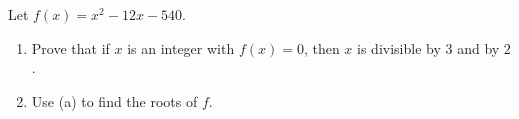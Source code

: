 Let $f(x)=x^2-12x-540$.
\begin{enumerate}
\item[(a)] Prove that if $x$ is an integer with $f(x)=0$, then $x$ is divisible by $3$ and by $2$.
\item[(b)] Use (a) to find the roots of $f$.
\end{enumerate}

